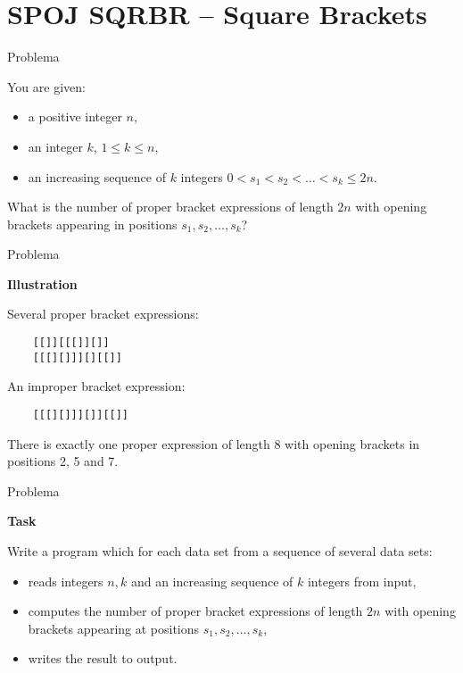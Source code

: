 \section{SPOJ SQRBR -- Square Brackets}

\begin{frame}[fragile]{Problema}

You are given:

\begin{itemize}
    \item a positive integer $n$,
    \item an integer $k$, $1\leq k\leq n$,
    \item an increasing sequence of $k$ integers $0 < s_1 < s_2 < \ldots < s_k \leq 2n$.
\end{itemize}

What is the number of proper bracket expressions of length $2n$ with opening brackets appearing in
positions $s_1, s_2, \ldots,s_k$?

\end{frame}

\begin{frame}[fragile]{Problema}

\textbf{Illustration}

    Several proper bracket expressions:
        \begin{verbatim}
    [[]][[[]][]] 
    [[[][]]][][[]]
        \end{verbatim}
An improper bracket expression:

        \begin{verbatim}
    [[[][]]][]][[]]
        \end{verbatim}
There is exactly one proper expression of length 8 with opening brackets in positions 2, 5 and 7.

\end{frame}

\begin{frame}[fragile]{Problema}

\textbf{Task}

    Write a program which for each data set from a sequence of several data sets:

    \begin{itemize}
        \item reads integers $n, k$ and an increasing sequence of $k$ integers from input,
        \item computes the number of proper bracket expressions of length $2n$ with opening
            brackets appearing at positions $s_1, s_2, \ldots, s_k$,
        \item writes the result to output.
    \end{itemize}

\end{frame}

